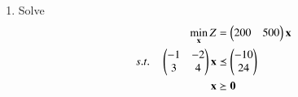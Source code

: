 \renewcommand{\theequation}{\theenumi}
\begin{enumerate}[label=\arabic*.,ref=\thesubsection.\theenumi]
\item Solve
\begin{align}
\min_{\mathbf{x}} Z &= \begin{pmatrix}200 & 500\end{pmatrix}\mathbf{x}
\\
s.t. \quad 
\begin{pmatrix}
	-1 & -2
	\\
	3 & 4
\end{pmatrix}
\mathbf{x} &\preceq \begin{pmatrix}-10\\24\end{pmatrix}
\\
\mathbf{x} &\succeq \mathbf{0}
\end{align} 
\end{enumerate}